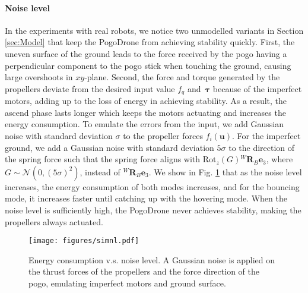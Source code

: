 \documentclass[letterpaper,10pt,conference]{ieeeconf}
\begin{document}
{\noindent
\paragraph{Noise level}{
In the experiments with real robots, we notice two unmodelled variants in Section \ref{sec:Model} that keep the PogoDrone from achieving stability quickly. First, the uneven surface of the ground leads to the force received by the pogo having a perpendicular component to the pogo stick when touching the ground, causing large overshoots in $xy$-plane. Second, the force and torque generated by the propellers deviate from the desired input value $f_q$ and~$\boldsymbol{\tau}$ because of the imperfect motors, adding up to the loss of energy in achieving stability. As a result, the ascend phase lasts longer which keeps the motors actuating and increases the energy consumption. To emulate the errors from the input, we add Gaussian noise with standard deviation $\sigma$ to the propeller forces $f_i(\boldsymbol{u})$. For the imperfect ground, we add a Gaussian noise with standard deviation $5\sigma$ to the direction of the spring force such that the spring force aligns with $\text{Rot}_z(G){}^W\!\!\boldsymbol{R}\!_B\boldsymbol{e}_3$, where $G \sim \mathcal{N}(0, (5\sigma)^2)$, instead of ${}^W\!\!\boldsymbol{R}\!_B\boldsymbol{e}_3$.
%
We show in Fig. \ref{fig:simnl} that as the noise level increases, the energy consumption of both modes increases, and for the bouncing mode, it increases faster until catching up with the hovering mode. When the noise level is sufficiently high, the PogoDrone never achieves stability, making the propellers always actuated.
\begin{figure}[t!]
    \texttt{[image: figures/simnl.pdf]}
    \caption{Energy consumption v.s. noise level. A Gaussian noise is applied on the thrust forces of the propellers and the force direction of the pogo, emulating imperfect motors and ground surface.}
    \label{fig:simnl}
\end{figure}
}

\noindent
}
\end{document}

